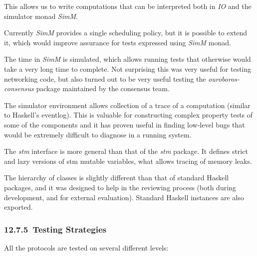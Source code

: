 \documentclass[]{article}
\begin{document}
This allows us to write computations that can be interpreted both in
\emph{IO} and the simulator monad \emph{SimM}.

Currently \emph{SimM} provides a single scheduling policy, but it is
possible to extend it, which would improve assurance for tests expressed
using \emph{SimM} monad.

The time in \emph{SimM} is simulated, which allows running tests that
otherwise would take a very long time to complete. Not surprising this
was very useful for testing networking code, but also turned out to be
very useful testing the \emph{ouroboros-consensus} package maintained by
the consensus team.

The simulator environment allows collection of a trace of a computation
(similar to Haskell's eventlog). This is valuable for constructing
complex property tests of some of the components and it has proven
useful in finding low-level bugs that would be extremely difficult to
diagnose in a running system.

The \emph{stm} interface is more general than that of the \emph{stm}
package. It defines strict and lazy versions of stm mutable variables,
what allows tracing of memory leaks.

The hierarchy of classes is slightly different than that of standard
Haskell packages, and it was designed to help in the reviewing process
(both during development, and for external evaluation). Standard Haskell
instances are also exported.

\hypertarget{testing-strategies}{%
\subsubsection{​12.7.5​~Testing Strategies}\label{testing-strategies}}

All the protocols are tested on several different levels:
\end{document}
